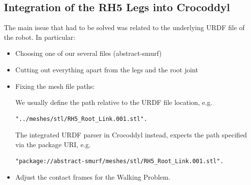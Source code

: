 \subsection{Integration of the RH5 Legs into Crocoddyl}
The main issue that had to be solved was related to the underlying URDF file of the robot. In particular: 
\begin{itemize}
\item Choosing one of our several files (abstract-smurf)
\item Cutting out everything apart from the legs and the root joint
\item Fixing the mesh file paths: 

We usually define the path relative to the URDF file location, e.g.
\begin{verbatim}
"../meshes/stl/RH5_Root_Link.001.stl".
\end{verbatim}
The integrated URDF parser in Crocoddyl instead, expects the path specified via the package URI, e.g. 
\begin{verbatim}
"package://abstract-smurf/meshes/stl/RH5_Root_Link.001.stl".
\end{verbatim}
\item Adjust the contact frames for the Walking Problem.
\end{itemize}

